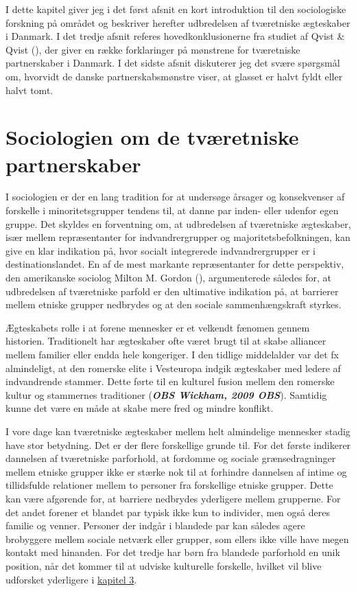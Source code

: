 \documentclass[
]{book}
\begin{document}
I dette kapitel giver jeg i det først afsnit en kort introduktion til den sociologiske forskning på området og beskriver herefter udbredelsen af tværetniske ægteskaber i Danmark. I det tredje afsnit referes hovedkonklusionerne fra studiet af Qvist \& Qvist (), der giver en række forklaringer på mønstrene for tværetniske partnerskaber i Danmark. I det sidste afsnit diskuterer jeg det svære spørgsmål om, hvorvidt de danske partnerskabsmønstre viser, at glasset er halvt fyldt eller halvt tomt.

\section{Sociologien om de tværetniske partnerskaber}\label{sociologien-om-de-tvuxe6retniske-partnerskaber}

I sociologien er der en lang tradition for at undersøge årsager og konsekvenser af forskelle i minoritetsgrupper tendens til, at danne par inden- eller udenfor egen gruppe. Det skyldes en forventning om, at udbredelsen af tværetniske ægteskaber, især mellem repræsentanter for indvandrergrupper og majoritetsbefolkningen, kan give en klar indikation på, hvor socialt integrerede indvandrergrupper er i destinationslandet. En af de mest markante repræsentanter for dette perspektiv, den amerikanske sociolog Milton M. Gordon (), argumenterede således for, at udbredelsen af tværetniske parfold er den ultimative indikation på, at barrierer mellem etniske grupper nedbrydes og at den sociale sammenhængskraft styrkes.

Ægteskabets rolle i at forene mennesker er et velkendt fænomen gennem historien. Traditionelt har ægteskaber ofte været brugt til at skabe alliancer mellem familier eller endda hele kongeriger. I den tidlige middelalder var det fx almindeligt, at den romerske elite i Vesteuropa indgik ægteskaber med ledere af indvandrende stammer. Dette førte til en kulturel fusion mellem den romerske kultur og stammernes traditioner (\textbf{\emph{OBS Wickham, 2009 OBS}}). Samtidig kunne det være en måde at skabe mere fred og mindre konflikt.

I vore dage kan tværetniske ægteskaber mellem helt almindelige mennesker stadig have stor betydning. Det er der flere forskellige grunde til. For det første indikerer dannelsen af tværetniske parforhold, at fordomme og sociale grænsedragninger mellem etniske grupper ikke er stærke nok til at forhindre dannelsen af intime og tillidsfulde relationer mellem to personer fra forskellige etniske grupper. Dette kan være afgørende for, at barriere nedbrydes yderligere mellem grupperne. For det andet forener et blandet par typisk ikke kun to individer, men også deres familie og venner. Personer der indgår i blandede par kan således agere brobyggere mellem sociale netværk eller grupper, som ellers ikke ville have megen kontakt med hinanden. For det tredje har børn fra blandede parforhold en unik position, når det kommer til at udviske kulturelle forskelle, hvilket vil blive udforsket yderligere i \hyperref[kap3]{kapitel 3}.
\end{document}
